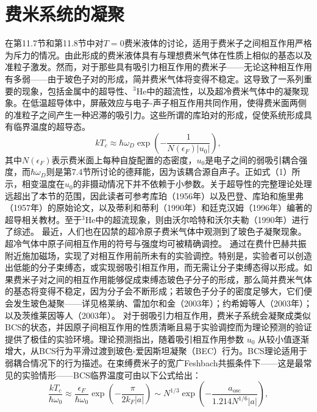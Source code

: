 \section{费米系统的凝聚}\label{ux8d39ux7c73ux7cfbux7edfux7684ux51ddux805a}
在第11.7节和第11.8节中对\(T=0\)费米液体的讨论，适用于费米子之间相互作用严格为斥力的情况。由此形成的费米液体具有与理想费米气体在性质上相似的基态以及准粒子激发。然而，对于那些具有吸引力相互作用的费米子——无论这种相互作用有多弱——由于玻色子对的形成，简并费米气体将变得不稳定。这导致了一系列重要的现象，包括金属中的超导性、\(^{3}\)He中的超流性，以及超冷费米气体中的凝聚现象。在低温超导体中，屏蔽效应与电子-声子相互作用共同作用，使得费米面两侧的准粒子之间产生一种迟滞的吸引力。这些所谓的库珀对的形成，促使系统形成具有临界温度的超导态。
\begin{equation}\tag{11.6.79}\label{eq:11.6.79}
k T _ { c } \approx \hbar \omega _ { D } \exp \left( - \frac { 1 } { N ( \epsilon _ { F } ) | u _ { 0 } | } \right) ,
\end{equation}
其中\(N(\epsilon_{F})\)表示费米面上每种自旋配置的态密度，\(u_{0}\)是电子之间的弱吸引耦合强度，而\(\hbar\omega_{D}\)则是第7.4节所讨论的德拜能，因为该耦合源自声子。正如式（1）所示，相变温度在\(u_{0}\)的非摄动情况下并不依赖于小参数。关于超导性的完整理论处理远超出了本节的范围，因此读者可参考库珀（1956年）以及巴登、库珀和施里弗（1957年）的原始论文，以及蒂利和蒂利（1990年）和廷克汉姆（1996年）编著的超导相关教材。至于\(^{3}\)He中的超流现象，则由沃尔哈特和沃尔夫勒（1990年）进行了综述。
最近，人们也在囚禁的超冷原子费米气体中观测到了玻色子凝聚现象。超冷气体中原子间相互作用的符号与强度均可被精确调控。
通过在费什巴赫共振附近施加磁场，实现了对相互作用前所未有的实验调控。特别是，实验者可以创造出低能的分子束缚态，或实现弱吸引相互作用，而无需让分子束缚态得以形成。如果费米子对之间的相互作用能够促成束缚态玻色子分子的形成，那么简并费米气体的基态将变得不稳定，因为分子会不断形成；若玻色子分子的密度足够大，它们便会发生玻色凝聚——详见格莱纳、雷加尔和金（2003年）；约希姆等人（2003年）；以及茨维莱因等人（2003年）。
对于弱吸引力相互作用，费米子系统会凝聚成类似BCS的状态，并因原子间相互作用的性质清晰且易于实验调控而为理论预测的验证提供了极佳的实验环境。理论预测指出，随着吸引相互作用参数 \(u_0\) 从较小值逐渐增大，从BCS行为平滑过渡到玻色-爱因斯坦凝聚（BEC）行为。BCS理论适用于弱耦合情况下的行为描述。在束缚费米子的宽广Feshbach共振条件下——这是最常见的实验情形——BCS临界温度可由以下公式给出：
\begin{equation}\tag{11.6.80}\label{eq:11.6.80}
\frac { k T _ { c } } { \hbar \omega _ { 0 } } \approx \frac { \epsilon _ { F } } { \hbar \omega _ { 0 } } \exp \left( - \frac { \pi } { 2 k _ { F } | a | } \right) \sim N ^{1 / 3} \exp \left( - \frac { a _ { \mathrm { o s c } } } { 1 . 21 4 N ^{1 / 6} | a | } \right) ,
\end{equation}
